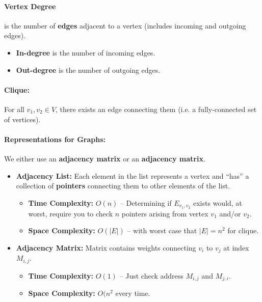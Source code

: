 \documentclass[a4paper,12pt]{report}
\begin{document}
\paragraph{Vertex Degree } is the number of \textbf{edges} adjacent to a vertex (includes incoming and outgoing edges).
\begin{itemize}
\item \textbf{In-degree} is the number of incoming edges.
\item \textbf{Out-degree} is the number of outgoing edges. 
\end{itemize}

\paragraph{Clique: } For all $v_1, v_2\in V$, there exists an edge connecting them (i.e. a fully-connected set of vertices). 


\paragraph{Representations for Graphs: } We either use an \textbf{adjacency matrix} or an \textbf{adjacency matrix}.

\begin{itemize}
\item \textbf{Adjacency List: } Each element in the list represents a vertex and ``has'' a collection of \textbf{pointers} connecting them to other elements of the list. 
\begin{itemize}
\item \textbf{Time Complexity: } $O(n)$ -- Determining if $E_{v_1,v_2}$ exists would, at worst, require you to check $n$ pointers arising from vertex $v_1$ and/or $v_2$. 
\item \textbf{Space Complexity: } $O(|E|)$ -- with worst case that $|E| = n^2$ for clique. 
\end{itemize}

\item \textbf{Adjacency Matrix: } Matrix contains weights connecting $v_i$ to $v_j$ at index $M_{i,j}$.
\begin{itemize}
\item \textbf{Time Complexity: } $O(1)$ -- Just check address $M_{i,j}$ and $M_{j,i}$.
\item \textbf{Space Complexity: } $O(n^2$ every time. 
\end{itemize}
\end{itemize}
\end{document}
